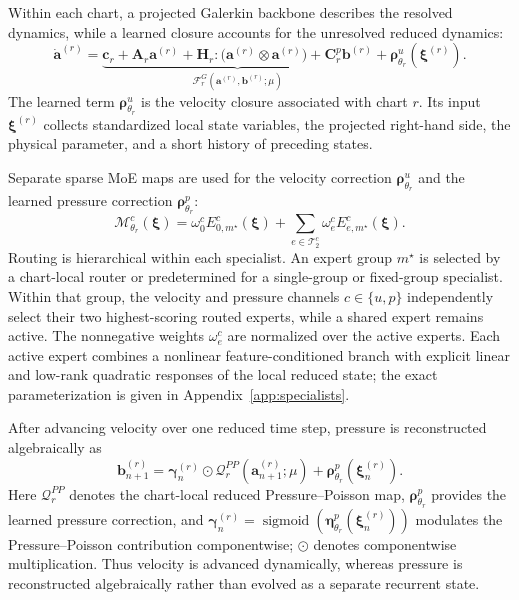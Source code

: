 \documentclass{article}
\begin{document}
Within each chart, a projected Galerkin backbone describes the resolved dynamics, while a learned closure accounts for the unresolved reduced dynamics:
\begin{equation}
  \dot{\bm a}^{(r)}=
  \underbrace{\bm c_r+\bm A_r\bm a^{(r)}+
  \bm H_r:\bigl(\bm a^{(r)}\otimes\bm a^{(r)}\bigr)+
  \bm C^p_r\bm b^{(r)}}_{\mathcal F_r^{G}(\bm a^{(r)},\bm b^{(r)};\mu)}
  +\bm\rho^u_{\theta_r}(\bm\xi^{(r)}).
  \label{eq:main_specialist}
\end{equation}
The learned term $\bm\rho^u_{\theta_r}$ is the velocity closure associated with chart $r$. Its input $\bm\xi^{(r)}$ collects standardized local state variables, the projected right-hand side, the physical parameter, and a short history of preceding states.

Separate sparse MoE maps are used for the velocity correction $\bm\rho^u_{\theta_r}$ and the learned pressure correction $\bm\rho^p_{\theta_r}$:
\begin{equation}
  \mathcal M^c_{\theta_r}(\bm\xi)=
  \omega^c_0 E^c_{0,m^\star}(\bm\xi)+
  \sum_{e\in\mathcal T_2^c}\omega^c_e E^c_{e,m^\star}(\bm\xi).
  \label{eq:main_inner_moe}
\end{equation}
Routing is hierarchical within each specialist. An expert group $m^\star$ is selected by a chart-local router or predetermined for a single-group or fixed-group specialist. Within that group, the velocity and pressure channels $c\in\{u,p\}$ independently select their two highest-scoring routed experts, while a shared expert remains active. The nonnegative weights $\omega_e^c$ are normalized over the active experts. Each active expert combines a nonlinear feature-conditioned branch with explicit linear and low-rank quadratic responses of the local reduced state; the exact parameterization is given in Appendix~\ref{app:specialists}.

After advancing velocity over one reduced time step, pressure is reconstructed algebraically as
\begin{equation}
  \bm b_{n+1}^{(r)}
  =\bm\gamma_n^{(r)}\odot\mathcal Q_r^{PP}(\bm a_{n+1}^{(r)};\mu)
  +\bm\rho^p_{\theta_r}(\bm\xi_n^{(r)}).
  \label{eq:main_pressure_closure}
\end{equation}
Here $\mathcal Q_r^{PP}$ denotes the chart-local reduced Pressure--Poisson map, $\bm\rho^p_{\theta_r}$ provides the learned pressure correction, and $\bm\gamma_n^{(r)} =\operatorname{sigmoid}(\bm\eta^p_{\theta_r}(\bm\xi_n^{(r)}))$ modulates the Pressure--Poisson contribution componentwise; $\odot$ denotes componentwise multiplication. Thus velocity is advanced dynamically, whereas pressure is reconstructed algebraically rather than evolved as a separate recurrent state.
\end{document}
